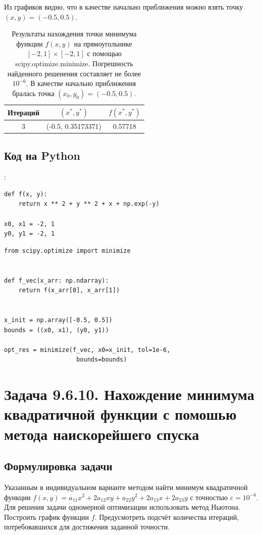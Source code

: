 \documentclass[12pt]{article}%
\begin{document}
Из графиков видно, что в качестве начально приближения можно взять точку $(x, y) = (-0.5, 0.5)$.

\begin{table}[!h]
\centering
\begin{tabular}{|c|c|c|}
    \hline Итераций & $(x^*, y^*)$ & $f(x^*, y^*)$ \\
    \hline 3 & (-0.5, 0.35173371) &  0.57718 \\
    \hline
\end{tabular}
    \caption{Результаты нахождения точки минимума функции $f(x, y)$ на прямоугольнике $[-2, 1] \times [-2, 1]$ с помощью scipy.optimize.minimize. Погрешность найденного решенения составляет не более $10^{-6}$. В качестве начально приближения бралась точка $(x_0, y_0) = (-0.5, 0.5)$.}
\end{table}


\subsection{Код на Python}:
\begin{verbatim}
def f(x, y):
    return x ** 2 + y ** 2 + x + np.exp(-y)

x0, x1 = -2, 1
y0, y1 = -2, 1
\end{verbatim}

\begin{verbatim}
from scipy.optimize import minimize


def f_vec(x_arr: np.ndarray):
    return f(x_arr[0], x_arr[1])


x_init = np.array([-0.5, 0.5])
bounds = ((x0, x1), (y0, y1))

opt_res = minimize(f_vec, x0=x_init, tol=1e-6, 
                    bounds=bounds)
\end{verbatim}



\newpage
\section{Задача 9.6.10. Нахождение минимума квадратичной функции с помошью метода наискорейшего спуска}

\subsection{Формулировка задачи}
Указанным в индивидуальном варианте методом найти минимум квадратичной функции $f(x, y) = a_{11}x^2 + 2a_{12}xy + a_{22} y^2 + 2a_{13}x + 2a_{23}y$
с точностью $\varepsilon=10^{-6}$. Для решения задачи одномерной оптимизации использовать метод Ньютона. Построить график функции $f$. Предусмотреть подсчёт количества итераций, потребовавшихся для достижения заданной точности.
\end{document}
